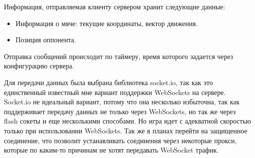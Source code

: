 Информация, отправляемая клиенту сервером хранит следующие данные:

\begin{itemize}
	\item Информация о мяче: текущие координаты, вектор движения.
	\item Позиция оппонента.
\end{itemize}

Отправка сообщений происходит по таймеру, время которого задается через конфигурацию сервера.

Для передачи данных была выбрана библиотека socket.io, так как это единственный известный мне вариант поддержки WebSockets на сервере. Socket.io не идеальный вариант, потому что она несколько избыточна, так как поддерживает передачу данных не только через WebSockets, но так же через flash сокеты и еще несколькими способами. Но игра идет с адекватной скоростью только при использовании WebSockets. Так же в планах перейти на защищенное соединение, что позволит устанавливать соединения через некоторые прокси, которые по каким-то причинам не хотят передавать WebSocket трафик.
